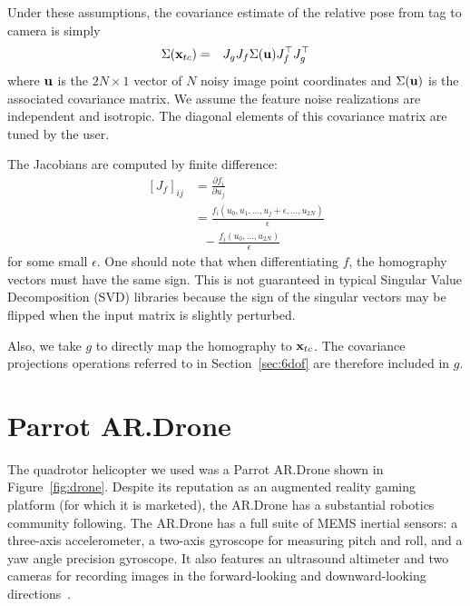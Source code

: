\documentclass[conference]{IEEEtran}
\begin{document}
Under these assumptions, the covariance estimate of the relative pose from tag to camera
is simply
\begin{eqnarray*}
  \Sigma({{\bf x}_{tc}}) & = & J_g J_f \Sigma({\bf u}) J_f^\top J_g^\top
\end{eqnarray*}
where ${\bf u}$ is the $2N \times 1$ vector of $N$ noisy image point coordinates and
$\Sigma({\bf u})$ is the associated covariance matrix.  We assume the feature noise
realizations are independent and isotropic. The diagonal elements of this covariance
matrix are tuned by the user.

The Jacobians are computed by finite difference:
\begin{align*}
  \left[J_f\right]_{ij} &=\frac{\partial f_i}{\partial u_j} \\
  &= \frac{f_i(u_0, u_1, \dots, u_j +
    \epsilon, \dots, u_{2N})}{\epsilon} \\
  & \ \ \  - \frac{f_i(u_0, \dots, u_{2N})}{\epsilon}
\end{align*}
for some small $\epsilon$. One should note that when differentiating $f$, the homography
vectors must have the same sign.  This is not guaranteed in typical Singular Value
Decomposition (SVD) libraries because the sign of the singular vectors may be flipped when
the input matrix is slightly perturbed.

Also, we take $g$ to directly map the homography to ${\bf x}_{tc}$.  The covariance
projections operations referred to in Section~\ref{sec:6dof} are therefore included in $g$.


\section{Parrot AR.Drone}
\label{sub:quadrotor}


The quadrotor helicopter we used was a Parrot AR.Drone shown in Figure~\ref{fig:drone}.
Despite its reputation as an augmented reality gaming platform (for which it is
marketed), the AR.Drone has a substantial robotics community following. The AR.Drone has
a full suite of MEMS inertial sensors: a three-axis accelerometer, a two-axis gyroscope
for measuring pitch and roll, and a yaw angle precision gyroscope. It also features an
ultrasound altimeter and two cameras for recording images in the forward-looking and
downward-looking directions~\cite{ardronedevguide}.
\end{document}
